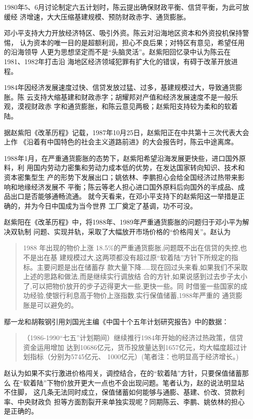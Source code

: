 1980年5、6月讨论制定六五计划时，陈云提出确保财政平衡、信贷平衡，为此可放缓经
济增速，大大压缩基建规模、预防财政赤字、通货膨胀。

邓小平支持大力开放经济特区、吸引外资。陈云对沿海地区资本和外资投机保持警惕，
认为资本的唯一目的是超额利润，担心不良后果；对特区有意见，希望任用的沿海领导
人更为思想坚定而不是“头脑灵活”。赵紫阳回忆录中认为陈云在1981、1982年打击沿
海地区经济领域犯罪有扩大化的错误，有碍于改革开放进程。

1984年因经济发展速度过快、信贷发放过猛、过多，基建规模过大，导致通货膨胀。陈
云支持大缩基建和财政赤字；胡耀邦对产值和经济发展速度不是一般乐观，漠视财政赤
字和通货膨胀，和陈云意见两极；赵紫阳支持较为柔和的软着陆。


据赵紫阳《改革历程》记载，1987年10月25日，赵紫阳正在中共第十三次代表大会上作
《沿着有中国特色的社会主义道路前进》的大会报告时，陈云中途离席。

1988年1月，在严重通货膨胀的态势下，赵紫阳希望沿海发展更快些，进口国外原料，利
用国内劳动力密集和劳动力成本低的优势，在发达国家转向知识、技术和资本密集型生
产的形势下发展出口；姚依林、李鹏担心会给全国经济过热带来影响和地缘经济发展不
平衡；陈云等老人担心进口国外原料后向国外的半成品、成品出口是否能够通畅流通。
就今天看来，在邓小平支持下的赵紫阳这一举措是正确的，并为今日中国成为当今世界
工厂奠定了基调，功不可没。


赵紫阳在《改革历程》中，将1988年、1989年严重通货膨胀的问题归于邓小平为解决双轨制
问题、实现并轨，采取了大幅放开市场价格的“价格闯关”。赵认为
\begin{quotation}
  1988 年出现的物价上涨 18.5\%的严重通货膨胀,问题既不出在信贷的失控,也不是出在基
  建规模过大,这两项都没有超过原“软着陆”方针下所规定的指标。主要问题是出在储蓄存
  款大量下降……现在回过头来看,如果我们不采取上述的思路和做法,而是继续实行调放结
  合的方针,如果说感到过去步子太小了,可以把物价放开的步子迈得更大一些,更快一些。同
  时借鉴一些国家的成功经验,使银行利息高于物价上涨指数,实行保值储蓄,1988年严重的
  通货膨胀是可以避免的。
\end{quotation}

鄢一龙和胡鞍钢引用刘国光主编《中国十个五年计划研究报告》中的数据：
\begin{quotation}
（1986-1990“七五”计划期间）继续推行1984年开始的经济过热政策，信贷资金运用增加
达到10686亿元，货币投放量达到1657亿元，均大幅度超过计划指标（分别为5745亿元、
1000亿元）(笔者注：也明显高于经济增长。)\cite{shiyiwu}
\end{quotation}

赵认为如果不实行激进价格闯关，调控结合，在的“软着陆”方针，只要保值储蓄那么
在“软着陆”下物价放开更大一点也不会出现问题。笔者认为，赵的说法明显站不住脚，
这几条无法同时成立，保值储蓄如何能够与通膨、基建、价改、贷款利率、中央财政负
担等方面割裂开来单独实现呢？同期陈云、李鹏、姚依林的担心是正确的。


